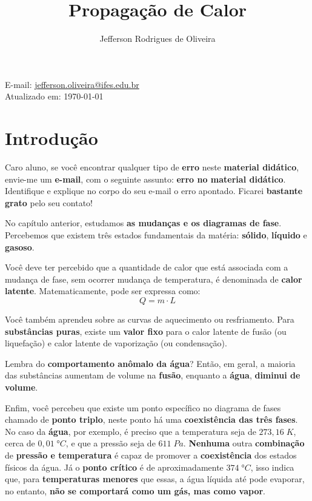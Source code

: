 \documentclass[12pt,twoside]{article}
\title{Propagação de Calor}
\author{Jefferson Rodrigues de Oliveira}
\date{}
\begin{document}
\maketitle
\begin{center}
	E-mail: \href{mailto:jefferson.oliveira@ifes.edu.br}{jefferson.oliveira@ifes.edu.br} \\
	\vspace{1cm}
	\footnotesize{Atualizado em: \today}
\end{center}
\tableofcontents
\newpage
\hypertarget{x-introdução}{\section{Introdução}}
Caro aluno, se você encontrar qualquer tipo de \textbf{erro} neste \textbf{material didático}, envie-me um \textbf{e-mail}, com o seguinte assunto: \textbf{erro no material didático}. Identifique e explique no corpo do seu e-mail o erro apontado. Ficarei \textbf{bastante grato} pelo seu contato!


No capítulo anterior, estudamos \textbf{as mudanças e os diagramas de fase}. Percebemos que existem três estados fundamentais da matéria: \textbf{sólido}, \textbf{líquido} e \textbf{gasoso}.


Você deve ter percebido que a quantidade de calor que está associada com a mudança de fase, sem ocorrer mudança de temperatura, é denominada de \textbf{calor latente}. Matematicamente, pode ser expressa como:\[Q=m\cdot L\]


Você também aprendeu sobre as curvas de aquecimento ou resfriamento. Para \textbf{substâncias puras}, existe um \textbf{valor fixo} para o calor latente de fusão (ou liquefação) e calor latente de vaporização (ou condensação).


Lembra do \textbf{comportamento anômalo da água}? Então, em geral, a maioria das substâncias aumentam de volume na \textbf{fusão}, enquanto a \textbf{água}, \textbf{diminui de volume}.


Enfim, você percebeu que existe um ponto específico no diagrama de fases chamado de \textbf{ponto triplo}, neste ponto há uma \textbf{coexistência das três fases}. No caso da \textbf{água}, por exemplo, é preciso que a temperatura seja de $273,16\;K$, cerca de \textbf{$0,01\;°C$}, e que a pressão seja de \textbf{$611\;Pa$}. \textbf{Nenhuma} outra \textbf{combinação} de \textbf{pressão e temperatura} é capaz de promover a \textbf{coexistência} dos estados físicos da água. Já o \textbf{ponto crítico} é de aproximadamente \textbf{$374\;°C$}, isso indica que, para \textbf{temperaturas menores} que essas, a água líquida até pode evaporar, no entanto, \textbf{não se comportará como um gás, mas como vapor}.
\end{document}
